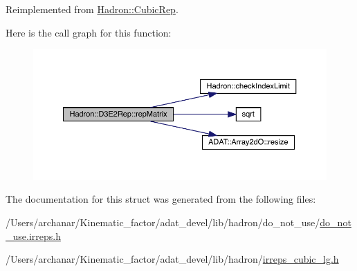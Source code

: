 Reimplemented from \mbox{\hyperlink{structHadron_1_1CubicRep_ac5d7e9e6f4ab1158b5fce3e4ad9e8005}{Hadron\+::\+Cubic\+Rep}}.

Here is the call graph for this function\+:
\nopagebreak
\begin{figure}[H]
\begin{center}
\leavevmode
\includegraphics[width=350pt]{db/de8/structHadron_1_1D3E2Rep_a941daa264ff6a6495a1bb521abe9021b_cgraph}
\end{center}
\end{figure}


The documentation for this struct was generated from the following files\+:\begin{DoxyCompactItemize}
\item 
/\+Users/archanar/\+Kinematic\+\_\+factor/adat\+\_\+devel/lib/hadron/do\+\_\+not\+\_\+use/\mbox{\hyperlink{do__not__use_8irreps_8h}{do\+\_\+not\+\_\+use.\+irreps.\+h}}\item 
/\+Users/archanar/\+Kinematic\+\_\+factor/adat\+\_\+devel/lib/hadron/\mbox{\hyperlink{lib_2hadron_2irreps__cubic__lg_8h}{irreps\+\_\+cubic\+\_\+lg.\+h}}\end{DoxyCompactItemize}

